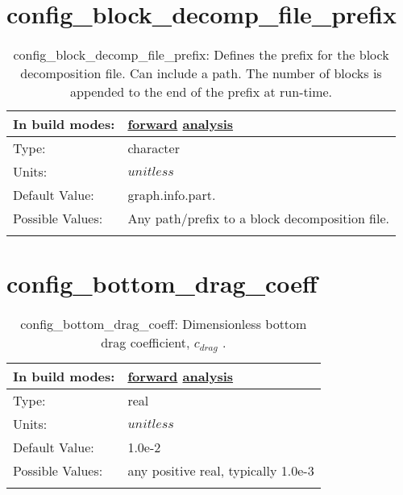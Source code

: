 \section[config\_block\_decomp\_file\_prefix]{config\_block\_decomp\_file\_prefix}
\label{sec:nm_sec_config_block_decomp_file_prefix}
\begin{center}
\begin{longtable}{| p{2.0in} || p{4.0in} |}
    \hline
    In build modes: & \hyperref[subsec:forward_nm_tab_decomposition]{forward} \hyperref[subsec:analysis_nm_tab_decomposition]{analysis} \\
    \hline
    Type: & character \\
    \hline
    Units: & $unitless$ \\
    \hline
    Default Value: & graph.info.part. \\
    \hline
    Possible Values: & Any path/prefix to a block decomposition file. \\
    \hline
    \caption{config\_block\_decomp\_file\_prefix: Defines the prefix for the block decomposition file. Can include a path. The number of blocks is appended to the end of the prefix at run-time.}
\end{longtable}
\end{center}
\section[config\_bottom\_drag\_coeff]{config\_bottom\_drag\_coeff}
\label{sec:nm_sec_config_bottom_drag_coeff}
\begin{center}
\begin{longtable}{| p{2.0in} || p{4.0in} |}
    \hline
    In build modes: & \hyperref[subsec:forward_nm_tab_bottom_drag]{forward} \hyperref[subsec:analysis_nm_tab_bottom_drag]{analysis} \\
    \hline
    Type: & real \\
    \hline
    Units: & $unitless$ \\
    \hline
    Default Value: & 1.0e-2 \\
    \hline
    Possible Values: & any positive real, typically 1.0e-3 \\
    \hline
    \caption{config\_bottom\_drag\_coeff:  Dimensionless bottom drag coefficient,  $c_{drag}$ .}
\end{longtable}
\end{center}
